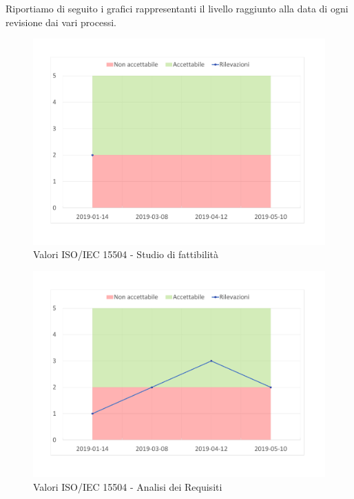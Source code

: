 Riportiamo di seguito i grafici rappresentanti il livello raggiunto alla data di ogni revisione dai vari processi.


\begin{figure}[H]
	\centering
	\includegraphics[scale=1]{images/resoconto/Studio.pdf}
	\caption{Valori ISO/IEC 15504 - Studio di fattibilità}	
\end{figure}


\begin{figure}[H]
	\centering
	\includegraphics[scale=1]{images/resoconto/Analisi.pdf}
	\caption{Valori ISO/IEC 15504 - Analisi dei Requisiti}	
\end{figure}


